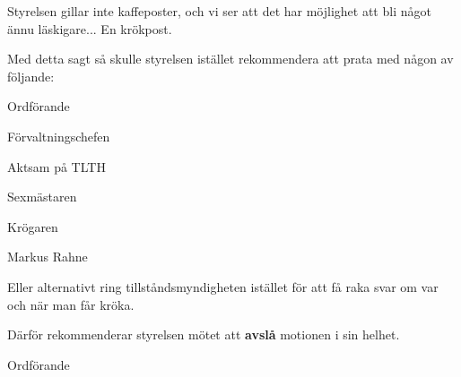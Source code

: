 \documentclass[../_main/handlingar.tex]{subfiles}
\begin{document}
\motionssvar

Styrelsen gillar inte kaffeposter, och vi ser att det har möjlighet att bli något ännu läskigare... En krökpost.

Med detta sagt så skulle styrelsen istället rekommendera att prata med någon av följande:
\begin{dashlist}
    \item Ordförande
    \item Förvaltningschefen
    \item Aktsam på TLTH
    \item Sexmästaren
    \item Krögaren
    \item Markus Rahne
\end{dashlist}

Eller alternativt ring tillståndsmyndigheten istället för att få raka svar om var och när man får kröka.


Därför rekommenderar styrelsen mötet att \textbf{avslå} motionen i sin helhet.

\begin{signatures}{1}
    \ist
    \signature{\ordf}{Ordförande}
\end{signatures}
\end{document}
